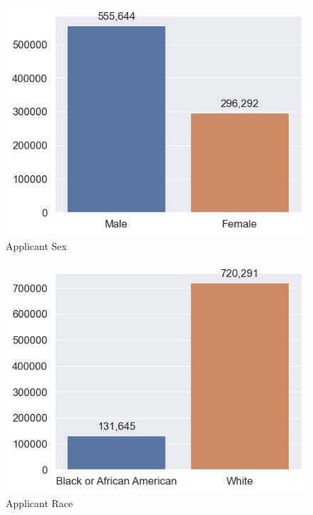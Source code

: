 \begin{figure}[!htbp]
    \centering
    \begin{minipage}{0.5\textwidth}
        \centering
        \includegraphics[width=\textwidth]{images/HMDA_features/HMDA_features_sex.png}
        \small
        Applicant Sex
    \end{minipage}\hfill
    \begin{minipage}{0.5\textwidth}
        \centering
        \includegraphics[width=\textwidth]{images/HMDA_features/HMDA_features_race.png}
        \small
        Applicant Race
    \end{minipage}
    


\end{figure}
